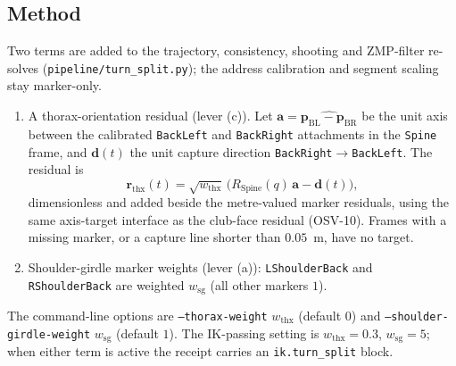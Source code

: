 \documentclass[11pt,a4paper]{article}
\begin{document}
\subsection{Method}
Two terms are added to the trajectory, consistency, shooting and ZMP-filter re-solves (\texttt{pipeline/turn\_split.py}); the address calibration and segment scaling stay marker-only.
\begin{enumerate}
\item A thorax-orientation residual (lever (c)). Let $\mathbf{a}=\widehat{\mathbf{p}_{\mathrm{BL}}-\mathbf{p}_{\mathrm{BR}}}$ be the unit axis between the calibrated \texttt{BackLeft} and \texttt{BackRight} attachments in the \texttt{Spine} frame, and $\mathbf{d}(t)$ the unit capture direction \texttt{BackRight}$\to$\texttt{BackLeft}. The residual is
\begin{equation}
\mathbf{r}_{\mathrm{thx}}(t)=\sqrt{w_{\mathrm{thx}}}\,\big(R_{\mathrm{Spine}}(q)\,\mathbf{a}-\mathbf{d}(t)\big),
\end{equation}
dimensionless and added beside the metre-valued marker residuals, using the same axis-target interface as the club-face residual (OSV-10). Frames with a missing marker, or a capture line shorter than $0.05$~m, have no target.
\item Shoulder-girdle marker weights (lever (a)): \texttt{LShoulderBack} and \texttt{RShoulderBack} are weighted $w_{\mathrm{sg}}$ (all other markers $1$).
\end{enumerate}
The command-line options are \texttt{--thorax-weight} $w_{\mathrm{thx}}$ (default $0$) and \texttt{--shoulder-girdle-weight} $w_{\mathrm{sg}}$ (default $1$). The IK-passing setting is $w_{\mathrm{thx}}=0.3$, $w_{\mathrm{sg}}=5$; when either term is active the receipt carries an \texttt{ik.turn\_split} block.
\end{document}
